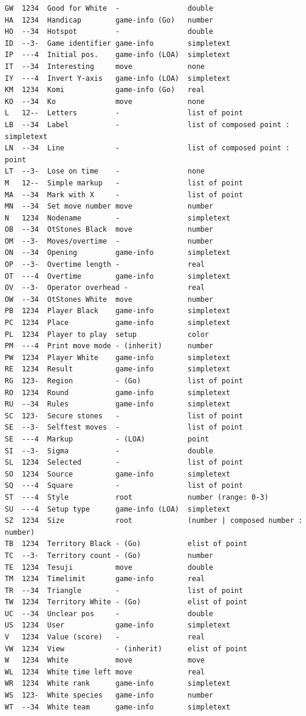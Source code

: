\begin{verbatim}
GW  1234  Good for White  -                double
HA  1234  Handicap        game-info (Go)   number
HO  --34  Hotspot         -                double
ID  --3-  Game identifier game-info        simpletext
IP  ---4  Initial pos.    game-info (LOA)  simpletext
IT  --34  Interesting     move             none
IY  ---4  Invert Y-axis   game-info (LOA)  simpletext
KM  1234  Komi            game-info (Go)   real
KO  --34  Ko              move             none
L   12--  Letters         -                list of point
LB  --34  Label           -                list of composed point : simpletext
LN  --34  Line            -                list of composed point : point
LT  --3-  Lose on time    -                none
M   12--  Simple markup   -                list of point
MA  --34  Mark with X     -                list of point
MN  --34  Set move number move             number
N   1234  Nodename        -                simpletext
OB  --34  OtStones Black  move             number
OM  --3-  Moves/overtime  -                number
ON  --34  Opening         game-info        simpletext
OP  --3-  Overtime length -                real
OT  ---4  Overtime        game-info        simpletext
OV  --3-  Operator overhead -              real
OW  --34  OtStones White  move             number
PB  1234  Player Black    game-info        simpletext
PC  1234  Place           game-info        simpletext
PL  1234  Player to play  setup            color
PM  ---4  Print move mode - (inherit)      number
PW  1234  Player White    game-info        simpletext
RE  1234  Result          game-info        simpletext
RG  123-  Region          - (Go)           list of point
RO  1234  Round           game-info        simpletext
RU  --34  Rules           game-info        simpletext
SC  123-  Secure stones   -                list of point
SE  --3-  Selftest moves  -                list of point
SE  ---4  Markup          - (LOA)          point
SI  --3-  Sigma           -                double
SL  1234  Selected        -                list of point
SO  1234  Source          game-info        simpletext
SQ  ---4  Square          -                list of point
ST  ---4  Style           root             number (range: 0-3)
SU  ---4  Setup type      game-info (LOA)  simpletext
SZ  1234  Size            root             (number | composed number : number)
TB  1234  Territory Black - (Go)           elist of point
TC  --3-  Territory count - (Go)           number
TE  1234  Tesuji          move             double
TM  1234  Timelimit       game-info        real
TR  --34  Triangle        -                list of point
TW  1234  Territory White - (Go)           elist of point
UC  --34  Unclear pos     -                double
US  1234  User            game-info        simpletext
V   1234  Value (score)   -                real
VW  1234  View            - (inherit)      elist of point
W   1234  White           move             move
WL  1234  White time left move             real
WR  1234  White rank      game-info        simpletext
WS  123-  White species   game-info        number
WT  --34  White team      game-info        simpletext
\end{verbatim}

